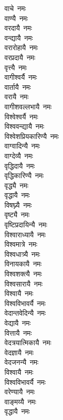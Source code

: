 \begin{flushleft}
\begin{multicols}{2}
वाचे~नमः\\
वाण्यै~नमः\\
वरदायै~नमः\\
वन्द्यायै~नमः\\
वरारोहायै~नमः\\
वरप्रदायै~नमः\\
वृत्त्यै~नमः\\
वागीश्वर्यै~नमः\\
वार्तायै~नमः\\
वरायै~नमः\hfill{}\\
वागीशवल्लभायै~नमः\\
विश्वेश्वर्यै~नमः\\
विश्ववन्द्यायै~नमः\\
विश्वेशप्रियकारिण्यै~नमः\\
वाग्वादिन्यै~नमः\\
वाग्देव्यै~नमः\\
वृद्धिदायै~नमः\\
वृद्धिकारिण्यै~नमः\\
वृद्ध्यै~नमः\\
वृद्धायै~नमः\hfill{}\\
विषघ्न्यै~नमः\\
वृष्ट्यै~नमः\\
वृष्टिप्रदायिन्यै~नमः\\
विश्वाराध्यायै~नमः\\
विश्वमात्रे~नमः\\
विश्वधात्र्यै~नमः\\
विनायकायै~नमः\\
विश्वशक्त्यै~नमः\\
विश्वसारायै~नमः\\
विश्वायै~नमः\hfill{}\\
विश्वविभावर्यै~नमः\\
वेदान्तवेदिन्यै~नमः\\
वेद्यायै~नमः\\
वित्तायै~नमः\\
वेदत्रयात्मिकायै~नमः\\
वेदज्ञायै~नमः\\
वेदजनन्यै~नमः\\
विश्वायै~नमः\\
विश्वविभावर्यै~नमः\\
वरेण्यायै~नमः\hfill{}\\
वाङ्मय्यै~नमः\\
वृद्धायै~नमः\\

\end{multicols}
\end{flushleft}
